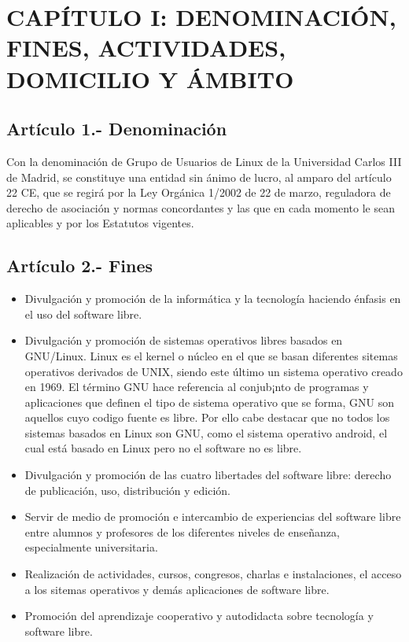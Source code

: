 \documentclass[10pt, spanish, pdftex]{gulplantilla}
\begin{document}
\newpage {}

\tableofcontents
\newpage {}
\mdseries


\newpage {}
\section{CAPÍTULO I: DENOMINACIÓN, FINES, ACTIVIDADES, DOMICILIO Y ÁMBITO}


\subsection{Artículo 1.- Denominación}
Con la denominación de Grupo de Usuarios de Linux de la Universidad Carlos III de Madrid, se constituye una entidad sin ánimo de lucro, al amparo del artículo 22 CE, que se regirá por la Ley Orgánica 1/2002 de 22 de marzo, reguladora de derecho de asociación y normas concordantes y las que en cada momento le sean aplicables y por los Estatutos vigentes.

\subsection{Artículo 2.- Fines}
\begin{itemize}
    \item Divulgación y promoción de la informática y la tecnología haciendo énfasis en el uso del software libre.
    \item Divulgación y promoción de sistemas operativos libres basados en GNU/Linux. Linux es el kernel o núcleo en el que se basan diferentes sitemas operativos derivados de UNIX, siendo este último un sistema operativo creado en 1969. El término GNU hace referencia al conjub¡nto de programas y aplicaciones que definen el tipo de sistema operativo que se forma, GNU son aquellos cuyo codigo fuente es libre. Por ello cabe destacar que no todos los sistemas basados en Linux son GNU, como el sistema operativo android, el cual está basado en Linux pero no el software no es libre.
    \item Divulgación y promoción de las cuatro libertades del software libre: derecho de publicación, uso, distribución y edición.
    \item Servir de medio de promoción e intercambio de experiencias del software libre entre alumnos y profesores de los diferentes niveles de enseñanza, especialmente universitaria.
    \item Realización de actividades, cursos, congresos, charlas e instalaciones, el acceso a los sitemas operativos y demás aplicaciones de software libre.
    \item Promoción del aprendizaje cooperativo y autodidacta sobre tecnología y software libre.
\end{itemize}
\end{document}
